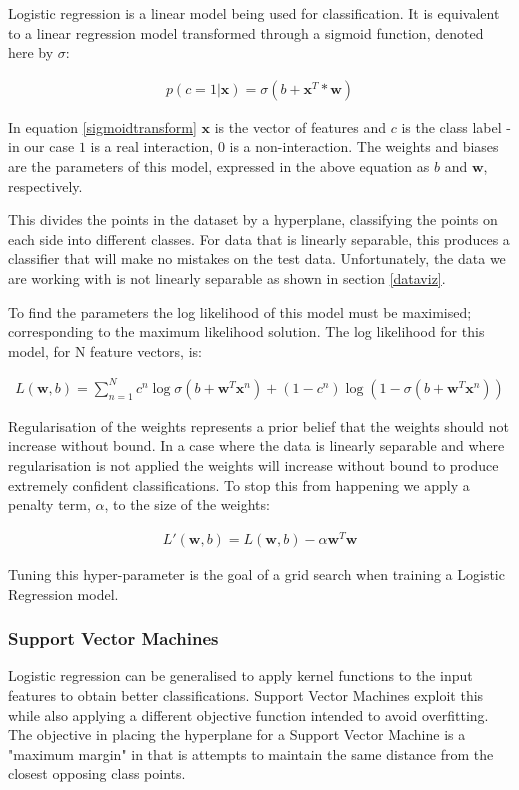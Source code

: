 Logistic regression is a linear model being used for classification.
It is equivalent to a linear regression model transformed through a sigmoid function\autocite[376]{murphy_machine_2012}, denoted here by $\sigma$:

\begin{align}
    p(c=1|\pmb{x}) = \sigma(b + \pmb{x}^{T}*\pmb{w})
    \label{sigmoidtransform}
\end{align}

In equation \ref{sigmoidtransform} $\pmb{x}$ is the vector of features and $c$ is the class label - in our case $1$ is a real interaction, $0$ is a non-interaction.
The weights and biases are the parameters of this model, expressed in the above equation as $b$ and $\pmb{w}$, respectively.

This divides the points in the dataset by a hyperplane, classifying the points on each side into different classes.
For data that is linearly separable, this produces a classifier that will make no mistakes on the test data.
Unfortunately, the data we are working with is not linearly separable as shown in section \ref{dataviz}.

To find the parameters the log likelihood of this model must be maximised; corresponding to the maximum likelihood solution.
The log likelihood for this model, for N feature vectors, is:

\begin{align}
    L(\pmb{w},b) = \sum_{n=1}^{N} c^{n} \log \sigma(b + \pmb{w}^{T}\pmb{x}^{n}) + (1 - c^{n})\log (1 - \sigma(b + \pmb{w}^{T}\pmb{x}^{n}))
\end{align}

Regularisation of the weights represents a prior belief that the weights should not increase without bound.
In a case where the data is linearly separable and where regularisation is not applied the weights will increase without bound to produce extremely confident classifications\autocite[381]{barber_bayesian_2013}.
To stop this from happening we apply a penalty term, $\alpha$, to the size of the weights:

\begin{align}
    L'(\pmb{w},b) = L(\pmb{w},b) - \alpha \pmb{w}^{T}\pmb{w}
\end{align}

Tuning this hyper-parameter is the goal of a grid search when training a Logistic Regression model.
\subsubsection*{Support Vector Machines}
Logistic regression can be generalised to apply kernel functions to the input features to obtain better classifications.
Support Vector Machines exploit this while also applying a different objective function intended to avoid overfitting\autocite[383]{murphy_machine_2012}.
The objective in placing the hyperplane for a Support Vector Machine is a "maximum margin" in that is attempts to maintain the same distance from the closest opposing class points.

